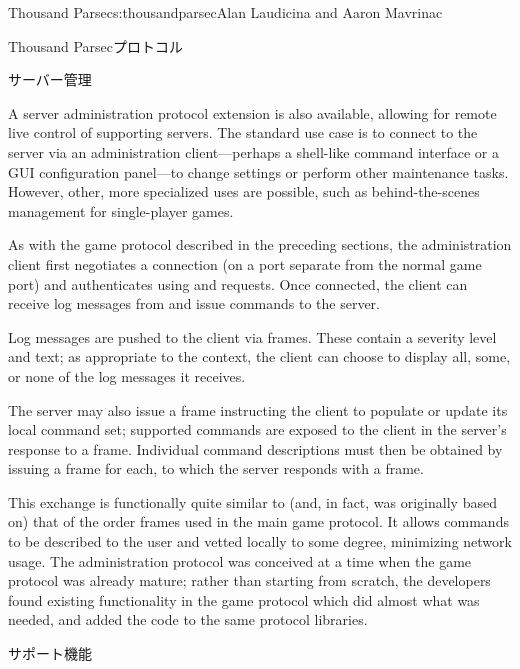 \begin{aosachapter}{Thousand Parsec}{s:thousandparsec}{Alan Laudicina and Aaron Mavrinac}
\begin{aosasect1}{Thousand Parsecプロトコル}
\begin{aosasect2}{サーバー管理}

A server administration protocol extension is also available, allowing
for remote live control of supporting servers. The standard use case
is to connect to the server via an administration client---perhaps a
shell-like command interface or a GUI configuration panel---to change
settings or perform other maintenance tasks. However, other, more
specialized uses are possible, such as behind-the-scenes management
for single-player games.

As with the game protocol described in the preceding sections, the
administration client first negotiates a connection (on a port
separate from the normal game port) and authenticates using
 and  requests. Once connected, the client
can receive log messages from and issue commands to the server.

Log messages are pushed to the client via 
frames. These contain a severity level and text; as appropriate to the
context, the client can choose to display all, some, or none of the
log messages it receives.

The server may also issue a  frame instructing
the client to populate or update its local command set; supported
commands are exposed to the client in the server's response to a
 frame. Individual command
descriptions must then be obtained by issuing a  frame for each, to which the server responds with a
 frame.

This exchange is functionally quite similar to (and, in fact, was
originally based on) that of the order frames used in the main game
protocol. It allows commands to be described to the user and vetted
locally to some degree, minimizing network usage. The administration
protocol was conceived at a time when the game protocol was already
mature; rather than starting from scratch, the developers found
existing functionality in the game protocol which did almost what was
needed, and added the code to the same protocol libraries.

\end{aosasect2}

\end{aosasect1}

\begin{aosasect1}{サポート機能}


\end{aosasect1}
\end{aosachapter}
